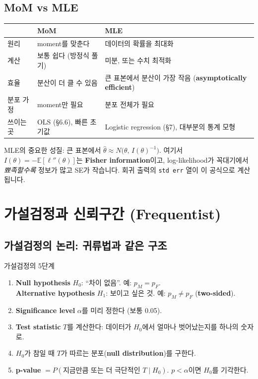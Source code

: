 \documentclass[11pt,a4paper]{article}
\newcommand{\E}{\mathbb{E}}
\newcommand{\term}[1]{\textbf{#1}}
\newcommand{\code}[1]{\texttt{#1}}
\begin{document}
\subsection{MoM vs MLE}
\begin{center}
\begin{tabular}{@{}p{3cm} p{5.6cm} p{5.6cm}@{}}
\toprule
 & MoM & MLE \\
\midrule
원리 & moment를 맞춘다 & 데이터의 확률을 최대화 \\
계산 & 보통 쉽다 (방정식 풀기) & 미분, 또는 수치 최적화 \\
효율 & 분산이 더 클 수 있음 & 큰 표본에서 분산이 가장 작음 (\term{asymptotically efficient}) \\
분포 가정 & moment만 필요 & 분포 전체가 필요 \\
쓰이는 곳 & OLS (\S6.6), 빠른 초기값 & Logistic regression (\S7), 대부분의 통계 모형 \\
\bottomrule
\end{tabular}
\end{center}
MLE의 중요한 성질: 큰 표본에서 $\hat\theta\approx N\big(\theta,\,I(\theta)^{-1}\big)$. 여기서 $I(\theta)=-\E[\ell''(\theta)]$는 \term{Fisher information}이고, log-likelihood가 꼭대기에서 \emph{뾰족할수록} 정보가 많고 SE가 작습니다. 회귀 출력의 \code{std err} 열이 이 공식으로 계산됩니다.

\section{가설검정과 신뢰구간 (Frequentist)}

\subsection{가설검정의 논리: 귀류법과 같은 구조}
\begin{defbox}{가설검정의 5단계}
\begin{enumerate}
\item \term{Null hypothesis} $H_0$: ``차이 없음''. 예: $p_M=p_F$.\\
\term{Alternative hypothesis} $H_1$: 보이고 싶은 것. 예: $p_M\neq p_F$ (\term{two-sided}).
\item \term{Significance level} $\alpha$를 미리 정한다 (보통 0.05).
\item \term{Test statistic} $T$를 계산한다: 데이터가 $H_0$에서 얼마나 벗어났는지를 하나의 숫자로.
\item $H_0$가 참일 때 $T$가 따르는 분포(\term{null distribution})를 구한다.
\item \term{p-value} $=P(\text{지금만큼 또는 더 극단적인 }T\mid H_0)$. $p<\alpha$이면 $H_0$를 기각한다.
\end{enumerate}
\end{defbox}
\end{document}
